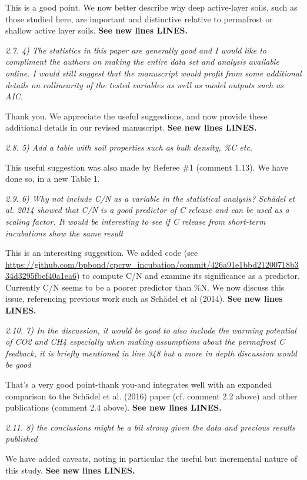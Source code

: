 \documentclass[11pt, oneside]{article}
\begin{document}
This is a good point. We now better describe why deep active-layer soils, such as those studied here, are important and distinctive relative to permafrost or shallow active layer soils. {\bf See new lines LINES.}

\medskip
{\it 2.7. 4) The statistics in this paper are generally good and I would like to compliment the authors on making the entire data set and analysis available online. I would still suggest that the manuscript would profit from some additional details on collinearity of the tested variables as well as model outputs such as AIC. }

Thank you. We appreciate the useful suggestions, and now provide these additional details in our revised manuscript. {\bf See new lines LINES.}

\medskip
{\it 2.8. 5) Add a table with soil properties such as bulk density, \%C etc. }

This useful suggestion was also made by Referee \#1 (comment 1.13). We have done so, in a new Table 1.

\medskip
{\it 2.9. 6) Why not include C/N as a variable in the statistical analysis? Schädel et al. 2014 showed that C/N is a good predictor of C release and can be used as a scaling factor. It would be interesting to see if C release from short-term incubations show the same result }

This is an interesting suggestion. We added code (see \url{https://github.com/bpbond/cpcrw_incubation/commit/426a91e1bbd21200718b334d3295fbef40a1ea6}) to compute C/N and examine its significance as a predictor. Currently C/N seems to be a poorer predictor than \%N. We now discuss this issue, referencing previous work such as Schädel et al (2014). {\bf See new lines LINES.}

\medskip
{\it 2.10. 7) In the discussion, it would be good to also include the warming potential of CO2 and CH4 especially when making assumptions about the permafrost C feedback, it is briefly mentioned in line 348 but a more in depth discussion would be good }

That's a very good point-thank you-and integrates well with an expanded comparison to the Schädel et al. (2016) paper (cf. comment 2.2 above) and other publications (comment 2.4 above). {\bf See new lines LINES.}

\medskip
{\it 2.11. 8) the conclusions might be a bit strong given the data and previous results published }

We have added caveats, noting in particular the useful but incremental nature of this study. {\bf See new lines LINES.}
\end{document}
